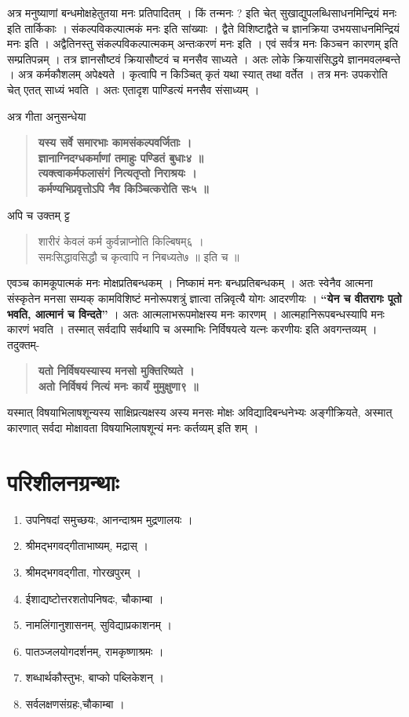 अत्र मनुष्याणां बन्धमोक्षहेतुतया मनः प्रतिपादितम् । किं तन्मनः ? इति चेत्  सुखाद्युपलब्धिसाधनमिन्द्रियं मनः इति तार्किकाः । संकल्पविकल्पात्मकं मनः इति सांख्याः । द्वैते विशिष्टाद्वैते च ज्ञानक्रिया उभयसाधनमिन्द्रियं मनः इति । अद्वैतिनस्तु संकल्पविकल्पात्मकम् अन्तःकरणं मनः इति । एवं सर्वत्र मनः किञ्चन कारणम् इति सम्प्रतिपन्नम् । तत्र ज्ञानसौष्टवं क्रियासौष्टवं च मनसैव साध्यते । अतः लोके क्रियासंसिद्धये ज्ञानमवलम्बन्ते । अत्र कर्मकौशलम् अपेक्ष्यते । कृत्वापि न किञ्चित् कृतं यथा स्यात् तथा वर्तेत । तत्र मनः उपकरोति चेत् एतत् साध्यं भवति । अतः एतादृश पाण्डित्यं मनसैव संसाध्यम् । 

अत्र गीता अनुसन्धेया 	
\begin{verse}
\textbf{यस्य सर्वे समारभाः कामसंकल्पवर्जिताः ।\\
ज्ञानाग्निदग्धकर्माणां तमाहुः पण्डितं बुधाः४ ॥\\
त्यक्त्वाकर्मफलासंगं नित्यतृप्तो निराश्रयः ।\\
कर्मण्यभिप्रवृत्तोऽपि नैव किञ्चित्करोति सः५ ॥}
\end{verse}
अपि च उक्तम् ट्ट
\begin{verse}
शारीरं केवलं कर्म कुर्वन्नाप्नोति किल्बिषम्६ ।\\
समःसिद्धावसिद्धौ च कृत्वापि न निबध्यते७ ॥ इति च ॥
\end{verse}
एवञ्च कामकूपात्मकं मनः मोक्षप्रतिबन्धकम् । निष्कामं मनः बन्धप्रतिबन्धकम् । अतः स्वेनैव आत्मना संस्कृतेन मनसा सम्यक् कामविशिष्टं मनोरूपशत्रुं ज्ञात्वा तन्निवृत्यै योगः आदरणीयः । \textbf{“येन च वीतरागः पूतो भवति, आत्मानं च विन्दते” }। अतः आत्मलाभरूपमोक्षस्य मनः कारणम् । आत्महानिरूपबन्धस्यापि मनः कारणं भवति । तस्मात् सर्वदापि सर्वथापि च अस्माभिः निर्विषयत्वे यत्नः करणीयः इति अवगन्तव्यम् । तदुक्तम्- 
\begin{verse}
\textbf{यतो निर्विषयस्यास्य मनसो मुक्तिरिष्यते ।\\
अतो निर्विषयं नित्यं मनः कार्यं मुमुक्षुणा९ ॥}
\end{verse}

यस्मात् विषयाभिलाषशून्यस्य साक्षिप्रत्यक्षस्य अस्य मनसः मोक्षः अविद्यादिबन्धनेभ्यः अङ्गीक्रियते, अस्मात् कारणात् सर्वदा मोक्षावता विषयाभिलाषशून्यं मनः कर्तव्यम् इति शम् ।  

\section*{परिशीलनग्रन्थाः }
\begin{enumerate}
\item उपनिषदां समुच्छयः, आनन्दाश्रम मुद्रणालयः । 
\item श्रीमद्भगवद्गीताभाष्यम्, मद्रास् ।
\item श्रीमद्भगवद्गीता, गोरखपुरम् ।
\item ईशाद्यष्टोत्तरशतोपनिषदः, चौकाम्बा । 
\item नामलिंगानुशासनम्, सुविद्याप्रकाशनम् ।
\item पातञ्जलयोगदर्शनम्, रामकृष्णाश्रमः ।
\item शब्धार्थकौस्तुभः, बाप्को पब्लिकेशन् ।
\item सर्वलक्षणसंग्रहः,चौकाम्बा ।
\end{enumerate}

\articleend
